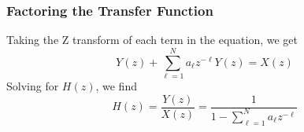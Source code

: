 \begin{frame}
  \frametitle{Factoring the Transfer Function}

  Taking the Z transform of each term in the equation, we get
  \[
  Y(z) + \sum_{\ell=1}^N a_\ell z^{-\ell} Y(z) = X(z)
  \]
  Solving for $H(z)$, we find
  \[
  H(z) = \frac{Y(z)}{X(z)} = \frac{1}{1-\sum_{\ell=1}^N a_\ell z^{-\ell}}
  \]
\end{frame}
